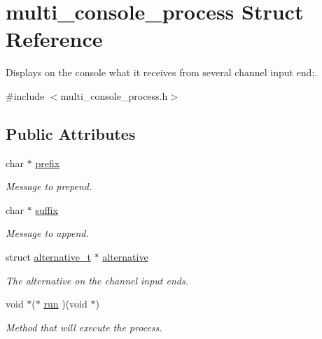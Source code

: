 \hypertarget{structmulti__console__process}{\section{multi\-\_\-console\-\_\-process Struct Reference}
\label{structmulti__console__process}
}


Displays on the console what it receives from several channel input end;.  




{\ttfamily \#include $<$multi\-\_\-console\-\_\-process.\-h$>$}

\subsection*{Public Attributes}
\begin{DoxyCompactItemize}
\item 
\hypertarget{structmulti__console__process_aca78f2f91acf49f060e38b38f8bf8af2}{char $\ast$ \hyperlink{structmulti__console__process_aca78f2f91acf49f060e38b38f8bf8af2}{prefix}}\label{structmulti__console__process_aca78f2f91acf49f060e38b38f8bf8af2}

\begin{DoxyCompactList}\small\item\em Message to prepend. \end{DoxyCompactList}\item 
\hypertarget{structmulti__console__process_aedf7f40bcad02cf66367961550049516}{char $\ast$ \hyperlink{structmulti__console__process_aedf7f40bcad02cf66367961550049516}{suffix}}\label{structmulti__console__process_aedf7f40bcad02cf66367961550049516}

\begin{DoxyCompactList}\small\item\em Message to append. \end{DoxyCompactList}\item 
\hypertarget{structmulti__console__process_af7f5fc967e71cacdac1a440dcaee636d}{struct \hyperlink{structalternative__t}{alternative\-\_\-t} $\ast$ \hyperlink{structmulti__console__process_af7f5fc967e71cacdac1a440dcaee636d}{alternative}}\label{structmulti__console__process_af7f5fc967e71cacdac1a440dcaee636d}

\begin{DoxyCompactList}\small\item\em The alternative on the channel input ends. \end{DoxyCompactList}\item 
\hypertarget{structmulti__console__process_a870f268510f3686fcee2ee9cecf38dd6}{void $\ast$($\ast$ \hyperlink{structmulti__console__process_a870f268510f3686fcee2ee9cecf38dd6}{run} )(void $\ast$)}\label{structmulti__console__process_a870f268510f3686fcee2ee9cecf38dd6}

\begin{DoxyCompactList}\small\item\em Method that will execute the process. \end{DoxyCompactList}\end{DoxyCompactItemize}


